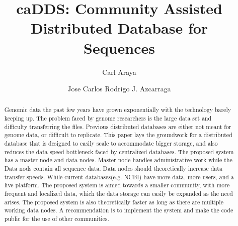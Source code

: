\documentclass[acmsmall]{acmart}
\begin{document}
\title{caDDS: Community Assisted Distributed Database for Sequences}

\author{Carl Araya}

\author{Jose Carlos Rodrigo J. Azcarraga}
\authornotemark[1]


\renewcommand{\shortauthors}{Araya and Azcarraga}

\begin{abstract}
Genomic data the past few years have grown exponentially with the technology barely keeping up. The problem faced by genome researchers is the large data set and difficulty transferring the files. Previous distributed databases are either not meant for genome data, or difficult to replicate. This paper lays the groundwork for a distributed database that is designed to easily scale to accommodate bigger storage, and also reduces the data speed bottleneck faced by centralized databases. The proposed system has a master node and data nodes. Master node handles administrative work while the Data nods contain all sequence data. Data nodes should theoretically increase data transfer speeds. While current databases(e.g. NCBI) have more data, more users, and a live platform. The proposed system is aimed towards a smaller community, with more frequent and localized data, which the data storage can easily be expanded as the need arises. The proposed system is also theoretically faster as long as there are multiple working data nodes. A recommendation is to implement the system and make the code public for the use of other communities.
\end{abstract}
\end{document}
